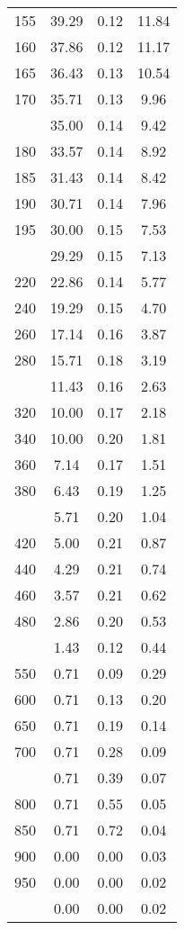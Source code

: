 \begin{table}[ht]
\begin{tabular}{lccc}
  155 & 39.29 & 0.12 & 11.84 \\ 
  160 & 37.86 & 0.12 & 11.17 \\ 
  165 & 36.43 & 0.13 & 10.54 \\ 
  170 & 35.71 & 0.13 & 9.96 \\ 
   \addlinespace
175 & 35.00 & 0.14 & 9.42 \\ 
  180 & 33.57 & 0.14 & 8.92 \\ 
  185 & 31.43 & 0.14 & 8.42 \\ 
  190 & 30.71 & 0.14 & 7.96 \\ 
  195 & 30.00 & 0.15 & 7.53 \\ 
   \addlinespace
200 & 29.29 & 0.15 & 7.13 \\ 
  220 & 22.86 & 0.14 & 5.77 \\ 
  240 & 19.29 & 0.15 & 4.70 \\ 
  260 & 17.14 & 0.16 & 3.87 \\ 
  280 & 15.71 & 0.18 & 3.19 \\ 
   \addlinespace
300 & 11.43 & 0.16 & 2.63 \\ 
  320 & 10.00 & 0.17 & 2.18 \\ 
  340 & 10.00 & 0.20 & 1.81 \\ 
  360 & 7.14 & 0.17 & 1.51 \\ 
  380 & 6.43 & 0.19 & 1.25 \\ 
   \addlinespace
400 & 5.71 & 0.20 & 1.04 \\ 
  420 & 5.00 & 0.21 & 0.87 \\ 
  440 & 4.29 & 0.21 & 0.74 \\ 
  460 & 3.57 & 0.21 & 0.62 \\ 
  480 & 2.86 & 0.20 & 0.53 \\ 
   \addlinespace
500 & 1.43 & 0.12 & 0.44 \\ 
  550 & 0.71 & 0.09 & 0.29 \\ 
  600 & 0.71 & 0.13 & 0.20 \\ 
  650 & 0.71 & 0.19 & 0.14 \\ 
  700 & 0.71 & 0.28 & 0.09 \\ 
   \addlinespace
750 & 0.71 & 0.39 & 0.07 \\ 
  800 & 0.71 & 0.55 & 0.05 \\ 
  850 & 0.71 & 0.72 & 0.04 \\ 
  900 & 0.00 & 0.00 & 0.03 \\ 
  950 & 0.00 & 0.00 & 0.02 \\ 
   \addlinespace
1000 & 0.00 & 0.00 & 0.02 \\ 
   \bottomrule
\end{tabular}
\end{table}
